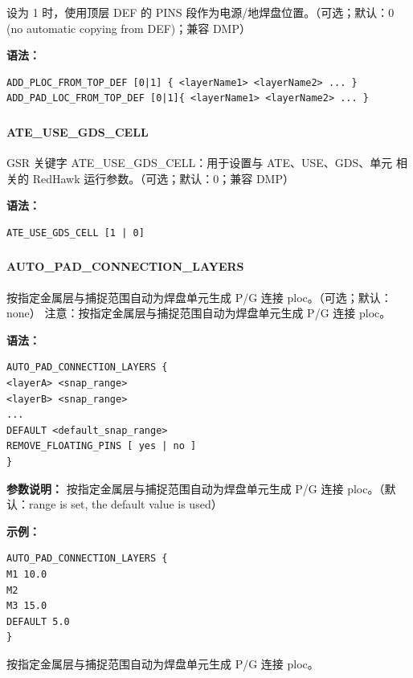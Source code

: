 设为 1 时，使用顶层 DEF 的 PINS 段作为电源/地焊盘位置。（可选；默认：0 (no automatic copying from DEF)；兼容 DMP）

\textbf{语法：}
\begin{lstlisting}
ADD_PLOC_FROM_TOP_DEF [0|1] { <layerName1> <layerName2> ... }
ADD_PAD_LOC_FROM_TOP_DEF [0|1]{ <layerName1> <layerName2> ... }
\end{lstlisting}

\subsubsection{}
\paragraph*{ATE_USE_GDS_CELL}

GSR 关键字 ATE_USE_GDS_CELL：用于设置与 ATE、USE、GDS、单元 相关的 RedHawk 运行参数。（可选；默认：0；兼容 DMP）

\textbf{语法：}
\begin{lstlisting}
ATE_USE_GDS_CELL [1 | 0]
\end{lstlisting}

\subsubsection{}
\paragraph*{AUTO_PAD_CONNECTION_LAYERS}

按指定金属层与捕捉范围自动为焊盘单元生成 P/G 连接 ploc。（可选；默认：none） 注意：按指定金属层与捕捉范围自动为焊盘单元生成 P/G 连接 ploc。

\textbf{语法：}
\begin{lstlisting}
AUTO_PAD_CONNECTION_LAYERS {
<layerA> <snap_range>
<layerB> <snap_range>
...
DEFAULT <default_snap_range>
REMOVE_FLOATING_PINS [ yes | no ]
}
\end{lstlisting}

\textbf{参数说明：}
按指定金属层与捕捉范围自动为焊盘单元生成 P/G 连接 ploc。（默认：range is set, the default value is used）

\textbf{示例：}
\begin{lstlisting}
AUTO_PAD_CONNECTION_LAYERS {
M1 10.0
M2
M3 15.0
DEFAULT 5.0
}
\end{lstlisting}

\begin{noteBox}
按指定金属层与捕捉范围自动为焊盘单元生成 P/G 连接 ploc。
\end{noteBox}

